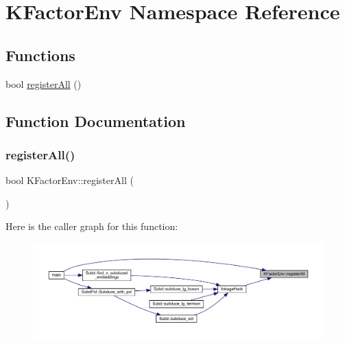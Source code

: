 \hypertarget{namespaceKFactorEnv}{}\section{K\+Factor\+Env Namespace Reference}
\label{namespaceKFactorEnv}
\subsection*{Functions}
\begin{DoxyCompactItemize}
\item 
bool \mbox{\hyperlink{namespaceKFactorEnv_a458bafc912e851a27c825155215c5083}{register\+All}} ()
\end{DoxyCompactItemize}


\subsection{Function Documentation}
\mbox{\label{namespaceKFactorEnv_a458bafc912e851a27c825155215c5083}} 
\subsubsection{\texorpdfstring{registerAll()}{registerAll()}}
{\footnotesize\ttfamily bool K\+Factor\+Env\+::register\+All (\begin{DoxyParamCaption}{ }\end{DoxyParamCaption})}

Here is the caller graph for this function\+:\nopagebreak
\begin{figure}[H]
\begin{center}
\leavevmode
\includegraphics[width=350pt]{d2/d90/namespaceKFactorEnv_a458bafc912e851a27c825155215c5083_icgraph}
\end{center}
\end{figure}
